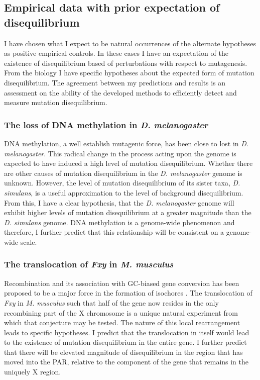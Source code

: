 \subsection{Empirical data with prior expectation of disequilibrium}

I have chosen what I expect to be natural occurrences of the alternate hypotheses as positive empirical controls. In these cases I have an expectation of the existence of disequilibrium based of perturbations with respect to mutagenesis. From the biology I have specific hypotheses about the expected form of mutation disequilibrium. The agreement between my predictions and results is an assessment on the ability of the developed methods to efficiently detect and measure mutation disequilibrium. 

\subsubsection{The loss of DNA methylation in \textit{D. melanogaster}}

DNA methylation, a well establish mutagenic force, has been close to lost in \textit{D. melanogaster}. This radical change in the process acting upon the genome is expected to have induced a high level of mutation disequilibrium. Whether there are other causes of mutation disequilibrium in the \textit{D. melanogaster} genome is unknown. However, the level of mutation disequilibrium of its sister taxa, \textit{D. simulans}, is a useful approximation to the level of background disequilibrium. From this, I have a clear hypothesis, that the \textit{D. melanogaster} genome will exhibit higher levels of mutation disequilibrium at a greater magnitude than the \textit{D. simulans} genome. DNA methylation is a genome-wide phenomenon and therefore, I further predict that this relationship will be consistent on a genome-wide scale. 
 
\subsubsection{The translocation of \textit{Fxy} in \textit{M. musculus}}

Recombination and its association with GC-biased gene conversion has been proposed to be a major force in the formation of isochores \citep{Montoya-Burgos2003RecombinationGenomes}. The translocation of \textit{Fxy} in \textit{M. musculus} such that half of the gene now resides in the only recombining part of the X chromosome is a unique natural experiment from which that conjecture may be tested. The nature of this local rearrangement leads to specific hypotheses. I predict that the translocation in itself would lead to the existence of mutation disequilibrium in the entire gene. I further predict that there will be elevated magnitude of disequilibrium in the region that has moved into the PAR, relative to the component of the gene that remains in the uniquely X region. 

